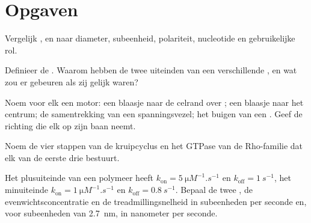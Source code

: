 \section{Opgaven}

\begin{exercise}[$\star$]\label{exo:b3:cytoskeleton-motility:1}
Vergelijk ,  en 
naar diameter, subeenheid, polariteit, nucleotide en gebruikelijke rol.
\end{exercise}

\begin{exercise}[$\star$]\label{exo:b3:cytoskeleton-motility:2}
Definieer de . Waarom hebben de twee uiteinden
van een  verschillende , en wat
zou er gebeuren als zij gelijk waren?
\end{exercise}

\begin{exercise}[$\star$]\label{exo:b3:cytoskeleton-motility:3}
Noem voor elk een motor: een blaasje naar de celrand over ;
een blaasje naar het centrum; de samentrekking van een spanningsvezel;
het buigen van een . Geef de richting die elk op zijn baan
neemt.
\end{exercise}

\begin{exercise}[$\star$]\label{exo:b3:cytoskeleton-motility:4}
Noem de vier stappen van de kruipcyclus en het GTPase van de
Rho-familie dat elk van de eerste drie bestuurt.
\end{exercise}

\begin{exercise}[$\star\star$]\label{exo:b3:cytoskeleton-motility:5}
Het plusuiteinde van een polymeer heeft $k_{\text{on}} = \qty{5}{\micro M^{-1}.s^{-1}}$
en $k_{\text{off}} = \qty{1}{s^{-1}}$, het minuiteinde $k_{\text{on}} =
\qty{1}{\micro M^{-1}.s^{-1}}$ en $k_{\text{off}} = \qty{0.8}{s^{-1}}$.
Bepaal de twee , de evenwichtsconcentratie en de
treadmillingsnelheid in subeenheden per seconde en, voor subeenheden van
\qty{2.7}{nm}, in nanometer per seconde.
\end{exercise}

